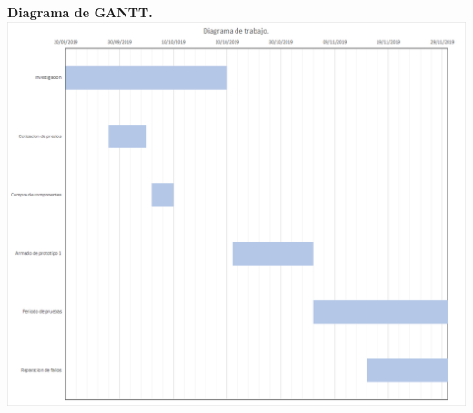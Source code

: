 \documentclass[letterpaper]{article}
\begin{document}
 
   
   
   \begin{LARGE}
        \textbf{Diagrama de GANTT.}\\
       \includegraphics[scale=0.5]{Img/DIAGANTT.png}
   \end{LARGE}
   \newpage
\end{document}

